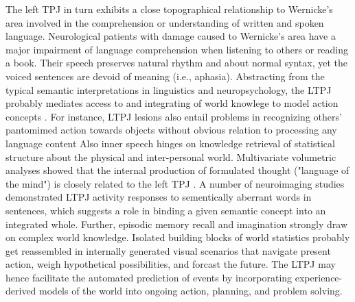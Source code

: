 \documentclass[10pt,letterpaper]{article}
\begin{document}
The left TPJ in turn exhibits a close topographical relationship to
Wernicke's area
involved in the comprehension or understanding of written and spoken language.
Neurological patients with damage caused to Wernicke's area
have a major impairment of language comprehension
when listening to others or reading a book.
Their speech
preserves natural rhythm and about normal syntax, yet the
voiced sentences are devoid of meaning (i.e., aphasia).
Abstracting from the typical semantic interpretations in linguistics
and neuropsychology,
the LTPJ probably mediates access to and integrating of world knowlege
to model action concepts
\citep{binder2011neurobiology, seghier2013angular}.
For instance, LTPJ lesions also entail problems in recognizing
others' pantomimed action towards objects
without obvious relation to processing any language content
\citep{varney1987locus}
%
Also inner speech hinges on knowledge retrieval of statistical structure
about the physical and inter-personal world.
Multivariate volumetric analyses showed that the internal production of
formulated thought ("language of the mind") is closely related to the left TPJ
\citep{geva2011neural}.
A number of neuroimaging studies demonstrated LTPJ activity responses
to sementically aberrant words in sentences, which suggests a role
in binding a given semantic concept into an integrated whole.
Further,
episodic memory recall and imagination strongly draw on
complex world knowledge.
Isolated building blocks of world statistics probably get reassembled
in internally generated visual scenarios that
navigate present action, weigh hypothetical possibilities, and forcast the future.
%
The LTPJ may hence facilitate the automated prediction of events
by incorporating experience-derived models of the world
into ongoing action, planning, and problem solving.
\end{document}
